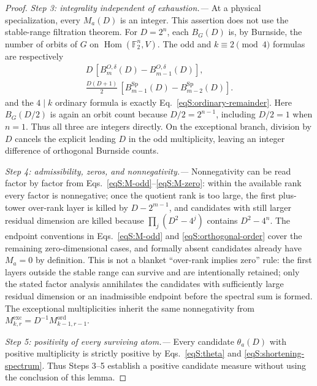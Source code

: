 \documentclass[journal,twocolumn]{IEEEtran}
\theoremstyle{definition}
\theoremstyle{plain}
\newcommand{\F}{\mathbb F}
\newcommand{\Ord}{\mathrm{ord}}
\newcommand{\Exc}{\mathrm{exc}}
\newcommand{\Sp}{\operatorname{Sp}}
\begin{document}
\begin{proof}
\emph{Step 3: integrality independent of exhaustion.---}
At a physical specialization, every $M_a(D)$ is an integer.  This assertion
does not use the stable-range filtration theorem.  For
$D=2^n$, each $B_G(D)$ is, by Burnside, the number of orbits of $G$ on
$\operatorname{Hom}(\F_2^n,V)$.  The odd and $k\equiv2\pmod4$ formulas
are respectively
\begin{equation}
 \begin{gathered}
 D\,[B_m^{O,\delta}(D)-B_{m-1}^{O,\delta}(D)],\\
 \frac{D(D+1)}2\,[B_{m-1}^{\Sp}(D)-B_{m-2}^{\Sp}(D)].
 \end{gathered}
 \label{eqS:integral-Burnside-differences}
\end{equation}
and the $4\mid k$ ordinary formula is exactly
Eq.~\eqref{eqS:ordinary-remainder}.  Here $B_G(D/2)$ is again an orbit
count because $D/2=2^{n-1}$, including $D/2=1$ when $n=1$.  Thus all
three are integers directly.  On the exceptional branch, division by
$D$ cancels the explicit leading $D$ in the odd multiplicity, leaving an
integer difference of orthogonal Burnside counts.

\emph{Step 4: admissibility, zeros, and nonnegativity.---}
Nonnegativity can be read factor by factor from
Eqs.~\eqref{eqS:M-odd}--\eqref{eqS:M-zero}:
within the available rank every factor is nonnegative; once the quotient
rank is too large, the first plus-tower over-rank layer is killed by
$D-2^{m-1}$, and candidates with still larger residual dimension are killed
because $\prod_j(D^2-4^j)$ contains $D^2-4^n$.
The endpoint conventions in Eqs.~\eqref{eqS:M-odd} and
\eqref{eqS:orthogonal-order} cover the remaining zero-dimensional cases,
and formally absent candidates already have $M_a=0$ by definition.  This is
not a blanket ``over-rank implies zero'' rule: the first layers outside the
stable range can survive and are intentionally retained; only the stated
factor analysis annihilates the candidates with sufficiently large residual
dimension or an inadmissible endpoint before the spectral sum is formed.
The exceptional multiplicities inherit the same nonnegativity from
$M^{\Exc}_{k,r}=D^{-1}M^{\Ord}_{k-1,r-1}$.

\emph{Step 5: positivity of every surviving atom.---}
Every candidate $\theta_a(D)$ with positive multiplicity is strictly
positive by Eqs.~\eqref{eqS:theta} and
\eqref{eqS:shortening-spectrum}.  Thus Steps 3--5 establish a positive
candidate measure without using the conclusion of this lemma.


\end{proof}
\end{document}
